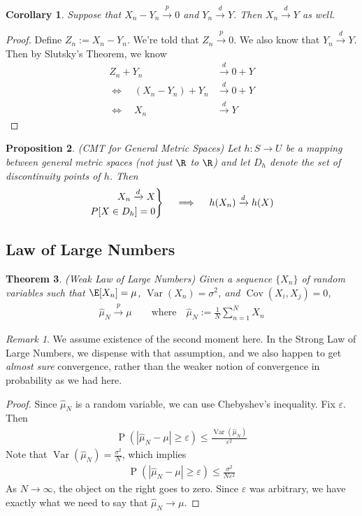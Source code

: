 \documentclass[12pt]{article}
\theoremstyle{plain}
\newtheorem{thm}{Theorem}[section]
\newtheorem{prop}[thm]{Proposition}
\newtheorem{cor}[thm]{Corollary}
\theoremstyle{definition}
\theoremstyle{remark}
\newtheorem*{rmk}{Remark}
\newcommand{\ra}{\rightarrow}
\newenvironment{rcases}
  {\left.\begin{aligned}}
  {\end{aligned}\right\rbrace}
\newcommand{\Cov}{\operatorname{Cov}}
\newcommand{\Prb}{\operatorname{P}}
\newcommand{\Var}{\operatorname{Var}}
\newcommand{\pto}{\xrightarrow{p}}
\newcommand{\dto}{\xrightarrow{d}}
\newcommand{\sumnN}{\sum^N_{n=1}}
\begin{document}
\begin{cor}
Suppose that $X_n - Y_n\pto 0$ and $Y_n\dto Y$. Then $X_n \dto Y$ as
well.
\end{cor}
\begin{proof}
Define $Z_n := X_n - Y_n$. We're told that $Z_n\pto 0$. We also know
that $Y_n\dto Y$. Then by Slutsky's Theorem, we know
\begin{align*}
  Z_n + Y_n &\dto 0 + Y \\
  \Leftrightarrow\quad (X_n-Y_n) + Y_n &\dto 0 + Y \\
  \Leftrightarrow\quad X_n &\dto Y
\end{align*}
\end{proof}

\begin{prop}(CMT for General Metric Spaces)
Let $h:S\ra U$ be a mapping between general metric spaces (not just $\R$
to $\R$) and let $D_h$ denote the set of discontinuity points of $h$.
Then
\begin{align*}
  \begin{rcases}
  X_n \dto X \\
  P[X\in D_h] = 0
  \end{rcases}
  \quad\implies\quad
  h(X_n) \dto h(X)
\end{align*}

\end{prop}


\clearpage
\subsection{Law of Large Numbers}

\begin{thm}\emph{(Weak Law of Large Numbers)}
Given a sequence $\{X_n\}$ of random variables such that
$\E[X_n]=\mu$, $\Var(X_n)=\sigma^2$, and $\Cov(X_i,X_j)=0$,
\begin{align*}
  \hat{\mu}_N \pto \mu
  \qquad\text{where} \quad
  \hat{\mu}_N := \frac{1}{N} \sumnN X_n
\end{align*}
\end{thm}
\begin{rmk}
We assume existence of the second moment here. In the Strong Law of
Large Numbers, we dispense with that assumption, and we also happen to
get \emph{almost sure} convergence, rather than the weaker notion of
convergence in probability as we had here.
\end{rmk}
\begin{proof}
Since $\hat{\mu}_N$ is a random variable, we can use Chebyshev's
inequality. Fix $\varepsilon$. Then
\begin{align*}
  \Prb(|\hat{\mu}_N -\mu| \geq \varepsilon)
  \leq \frac{\Var(\hat{\mu}_N)}{\varepsilon^2}
\end{align*}
Note that $\Var(\hat{\mu}_N) = \frac{\sigma^2}{N}$, which implies
\begin{align*}
  \Prb(|\hat{\mu}_N -\mu| \geq \varepsilon)
  \leq \frac{\sigma^2}{N\varepsilon^2}
\end{align*}
As $N\ra\infty$, the object on the right goes to zero. Since
$\varepsilon$ was arbitrary, we have exactly what we need to say that
$\hat{\mu}_N\ra\mu$.
\end{proof}
\end{document}
